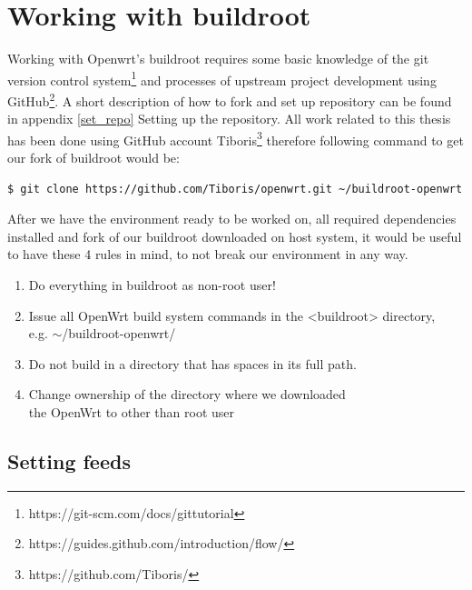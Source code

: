 \section{Working with buildroot}\label{working-with-buildroot}

Working with Openwrt's buildroot requires some basic knowledge of the git version control system\footnote{https://git-scm.com/docs/gittutorial} and processes of upstream project development using GitHub\footnote{https://guides.github.com/introduction/flow/}.
A short description of how to fork and set up repository can be found in appendix \ref{set_repo} Setting up the repository.
All work related to this thesis has been done using GitHub account Tiboris\footnote{https://github.com/Tiboris/} therefore following command to get our fork of buildroot would be:
\begin{lstlisting}[columns=fixed,basicstyle=\ttfamily\footnotesize,tabsize=4,backgroundcolor=\color{yellow!10}]
$ git clone https://github.com/Tiboris/openwrt.git ~/buildroot-openwrt
\end{lstlisting}

After we have the environment ready to be worked on, all required dependencies installed and fork of our buildroot downloaded on host system, it would be useful to have these 4 rules in mind, to not break our environment in any way.
\begin{enumerate}
    \item Do everything in buildroot as non-root user!
    \item Issue all OpenWrt build system commands in the <buildroot> directory, \\e.g. $\sim$/buildroot-openwrt/
    \item Do not build in a directory that has spaces in its full path.
    \item Change ownership of the directory where we downloaded \\the OpenWrt to other than root user
\end{enumerate}



\subsection{Setting feeds}

